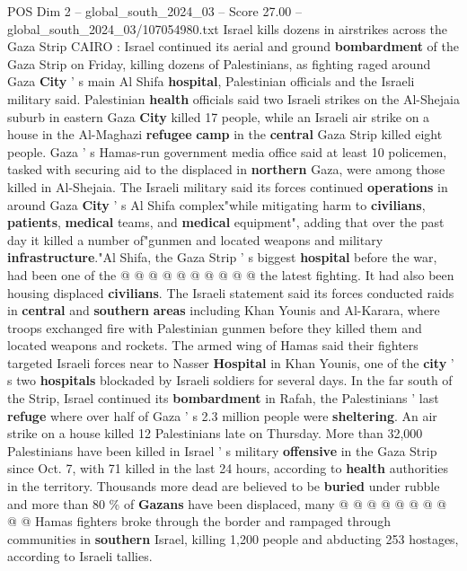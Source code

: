 \begin{textsample}{POS Dim 2 – global\_south\_2024\_03 – Score 27.00 – global\_south\_2024\_03/107054980.txt}  \label{ex:f2_pos_008}
Israel kills dozens in airstrikes across the Gaza Strip CAIRO : Israel continued its aerial and ground \textbf{bombardment} of the Gaza Strip on Friday, killing dozens of Palestinians, as fighting raged around Gaza \textbf{City} ' s main Al Shifa \textbf{hospital}, Palestinian officials and the Israeli military said.
Palestinian \textbf{health} officials said two Israeli strikes on the Al-Shejaia suburb in eastern Gaza \textbf{City} killed 17 people, while an Israeli air strike on a house in the Al-Maghazi \textbf{refugee} \textbf{camp} in the \textbf{central} Gaza Strip killed eight people.
Gaza ' s Hamas-run government media office said at least 10 policemen, tasked with securing aid to the displaced in \textbf{northern} Gaza, were among those killed in Al-Shejaia.
The Israeli military said its forces continued \textbf{operations} in around Gaza \textbf{City} ' s Al Shifa complex"while mitigating harm to \textbf{civilians}, \textbf{patients}, \textbf{medical} teams, and \textbf{medical} equipment", adding that over the past day it killed a number of"gunmen and located weapons and military \textbf{infrastructure}."Al Shifa, the Gaza Strip ' s biggest \textbf{hospital} before the war, had been one of the @ @ @ @ @ @ @ @ @ @ the latest fighting.
It had also been housing displaced \textbf{civilians}.
The Israeli statement said its forces conducted raids in \textbf{central} and \textbf{southern} \textbf{areas} including Khan Younis and Al-Karara, where troops exchanged fire with Palestinian gunmen before they killed them and located weapons and rockets.
The armed wing of Hamas said their fighters targeted Israeli forces near to Nasser \textbf{Hospital} in Khan Younis, one of the \textbf{city} ' s two \textbf{hospitals} blockaded by Israeli soldiers for several days.
In the far south of the Strip, Israel continued its \textbf{bombardment} in Rafah, the Palestinians ' last \textbf{refuge} where over half of Gaza ' s 2.3 million people were \textbf{sheltering}.
An air strike on a house killed 12 Palestinians late on Thursday.
More than 32,000 Palestinians have been killed in Israel ' s military \textbf{offensive} in the Gaza Strip since Oct. 7, with 71 killed in the last 24 hours, according to \textbf{health} authorities in the territory.
Thousands more dead are believed to be \textbf{buried} under rubble and more than 80 \% of \textbf{Gazans} have been displaced, many @ @ @ @ @ @ @ @ @ @ Hamas fighters broke through the border and rampaged through communities in \textbf{southern} Israel, killing 1,200 people and abducting 253 hostages, according to Israeli tallies.

\end{textsample}

